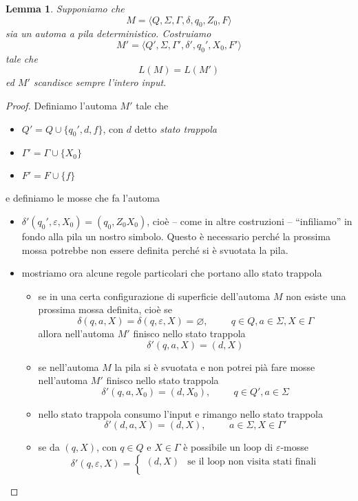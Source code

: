 \documentclass[12pt]{report}
\newtheorem{lemma}{Lemma}
\theoremstyle{definition}
\theoremstyle{regard}
\begin{document}
\begin{lemma}
	Supponiamo che
	$$ M = \langle Q, \Sigma, \Gamma, \delta, q_0, Z_0, F \rangle $$
	sia un automa a pila deterministico.
	Costruiamo 
	$$ M' = \langle Q', \Sigma, \Gamma', \delta', q_0', X_0, F' \rangle $$
	tale che
	$$ L(M) = L(M') $$
	ed $M'$ scandisce sempre l'intero input.
\end{lemma}
\begin{proof}
	Definiamo l'automa $M'$ tale che
	\begin{itemize}
		\item $Q' = Q \cup \{q_0', d, f \}$, con $d$ detto \textit{stato trappola}
		\item $\Gamma' = \Gamma \cup \{X_0\} $
		\item $F' = F \cup \{ f \} $
	\end{itemize}
	e definiamo le mosse che fa l'automa
	\begin{itemize}
		\item $\delta'(q_0', \varepsilon, X_0) = (q_0, Z_0X_0)$, cioè -- come in altre costruzioni -- ``infiliamo'' in fondo alla pila un nostro simbolo.
			Questo è necessario perché la prossima mossa potrebbe non essere definita perché si è svuotata la pila.
		\item mostriamo ora alcune regole particolari che portano allo stato trappola
			\begin{itemize}
				\item se in una certa configurazione di superficie dell'automa $M$ non esiste una prossima mossa definita, cioè se
					$$\delta(q, a, X) = \delta(q, \varepsilon, X) = \varnothing, \hspace{1cm} q \in Q, a \in \Sigma, X \in \Gamma$$
					allora nell'automa $M'$ finisco nello stato trappola
					$$\delta'(q, a, X) = (d, X)$$
				\item se nell'automa $M$ la pila si è svuotata e non potrei pià fare mosse nell'automa $M'$ finisco nello stato trappola
					$$\delta'(q, a, X_0) = (d, X_0),\hspace{1cm}q \in Q', a \in \Sigma$$
				\item nello stato trappola consumo l'input e rimango nello stato trappola
					$$\delta'(d, a, X) = (d, X),\hspace{1cm}a \in \Sigma, X \in \Gamma'$$
				\item se da $(q, X)$, con $q \in Q$ e $X \in \Gamma$ è possibile un loop di $\varepsilon$-mosse
					$$\delta'(q, \varepsilon, X) = 
					\begin{cases}
						(d, X) & \text{se il loop non visita stati finali} \\

\end{cases}$$
\end{itemize}
\end{itemize}
\end{proof}
\end{document}
